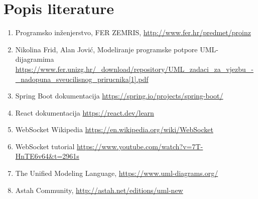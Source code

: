 \chapter*{Popis literature}
		
		
		\begin{enumerate}
			
			\item Programsko inženjerstvo, FER ZEMRIS, \url{http://www.fer.hr/predmet/proinz}
			
			\item Nikolina Frid, Alan Jović, Modeliranje programske potpore UML-dijagramima \url{https://www.fer.unizg.hr/_download/repository/UML_zadaci_za_vjezbu_-_nadopuna_sveucilisnog_prirucnika[1].pdf}
			
			\item Spring Boot dokumentacija \url{https://spring.io/projects/spring-boot/}
			
			\item React dokumentacija \url{https://react.dev/learn}
			
			\item WebSocket Wikipedia \url{https://en.wikipedia.org/wiki/WebSocket}
			
			\item WebSocket tutorial \url{https://www.youtube.com/watch?v=7T-HnTE6v64&t=2961s}
			
			\item The Unified Modeling Language, \url{https://www.uml-diagrams.org/}
			
			\item Astah Community, \url{http://astah.net/editions/uml-new}
			
		\end{enumerate}
		
		 